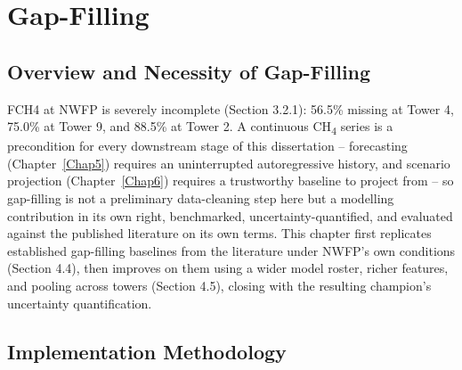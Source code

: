 \chapter{Gap-Filling} \label{Chap4}

\section{Overview and Necessity of Gap-Filling}

FCH4 at NWFP is severely incomplete (Section 3.2.1): 56.5\% missing at Tower 4, 75.0\% at Tower 9,
and 88.5\% at Tower 2. A continuous CH\textsubscript{4} series is a precondition for every
downstream stage of this dissertation -- forecasting (Chapter~\ref{Chap5}) requires an
uninterrupted autoregressive history, and scenario projection (Chapter~\ref{Chap6}) requires a
trustworthy baseline to project from -- so gap-filling is not a preliminary data-cleaning step here
but a modelling contribution in its own right, benchmarked, uncertainty-quantified, and evaluated
against the published literature on its own terms. This chapter first replicates established
gap-filling baselines from the literature under NWFP's own conditions (Section 4.4), then improves
on them using a wider model roster, richer features, and pooling across towers (Section 4.5),
closing with the resulting champion's uncertainty quantification.

\section{Implementation Methodology}

